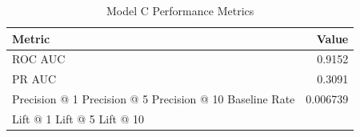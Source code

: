 \begin{table}[h]
\centering
\begin{tabular}{lr}
\toprule
Metric & Value \\
\midrule
ROC AUC & 0.9152 \\
PR AUC & 0.3091 \\
Precision @ 1%
Precision @ 5%
Precision @ 10%
Baseline Rate & 0.006739 \\
Lift @ 1%
Lift @ 5%
Lift @ 10%
\bottomrule
\end{tabular}
\caption{Model C Performance Metrics}
\label{tab:modelc_metrics}
\end{table}
